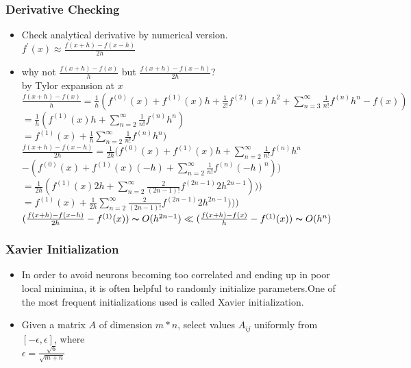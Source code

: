 \begin{frame}
\frametitle{Derivative Checking}
	\small
	\begin{itemize}
		\item Check analytical derivative by numerical version. \\
		$f^{\prime} (x)\approx \frac{f(x+h)-f(x-h)}{2h}$
		\item why not $\frac{f(x+h)-f(x)}{h}$ but $\frac{f(x+h)-f(x-h)}{2h}$?
		\\by Tylor expansion at $x$
		\\$\frac{f(x+h)-f(x)}{h}=\frac{1}{h}(f^{(0)}(x)+f^{(1)}(x)h+\frac{1}{2!}f^{(2)}(x)h^2
				+\sum_{n=3}^{\infty}\frac{1}{n!}f^{(n)}h^n-f(x))$
			\\\hspace{1.8cm}$=\frac{1}{h}(f^{(1)}(x)h+\sum_{n=2}^{\infty}\frac{1}{n!}f^{(n)}h^n)$
			\\\hspace{1.8cm}$=f^{(1)}(x)+\frac{1}{h}\sum_{n=2}^{\infty}\frac{1}{n!}f^{(n)}h^n)$
		\\$\frac{f(x+h)-f(x-h)}{2h}=\frac{1}{2h}(f^{(0)}(x)+f^{(1)}(x)h+\sum_{n=2}^{\infty}\frac{1}{n!}f^{(n)}h^n$ 
			\\\hspace{2cm}$-(f^{(0)}(x)+f^{(1)}(x)(-h)+\sum_{n=2}^{\infty}\frac{1}{n!}f^{(n)}(-h)^n))$
			\\\hspace{2cm}$=\frac{1}{2h}(f^{(1)}(x)2h+\sum_{n=2}^{\infty}\frac{2}{(2n-1)!}f^{(2n-1)}2h^{2n-1})))$
			\\\hspace{2cm}$=f^{(1)}(x)+\frac{1}{2h}\sum_{n=2}^{\infty}\frac{2}{(2n-1)!}f^{(2n-1)}2h^{2n-1})))$
			\\$(\frac{f(x+h)-f(x-h)}{2h}-f^{(1)}(x))\thicksim O(h^{2n-1}) \ll  (\frac{f(x+h)-f(x)}{h}-f^{(1)}(x))\thicksim O(h^n)$
	\end{itemize}
\end{frame}
\begin{frame}
\frametitle{Xavier Initialization}
	\small
	\begin{itemize}
		\item  In order to avoid neurons becoming too correlated and ending up in poor local minimina, it
is often helpful to randomly initialize parameters.One of the most frequent initializations used is called
Xavier initialization.
		\item Given a matrix $A$ of dimension $m * n$, select values $A_{ij}$ uniformly from $[−\epsilon,\epsilon]$, where
		\\\hspace{5cm}$\epsilon = \frac{\sqrt{6}}{\sqrt{m+n}}$
	\end{itemize}
\end{frame}
\ifx\allfiles\undefined

\fi
